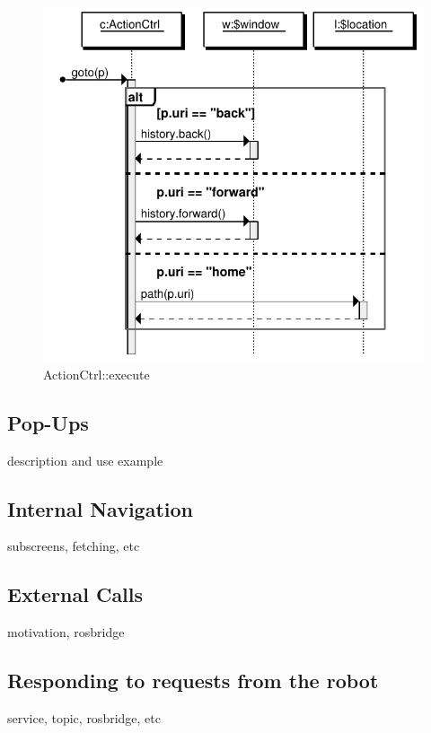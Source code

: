 \begin{figure}[htb]
    \centering
    \includegraphics{figures/design/seqdia/actionCtrl-goto.pdf}
    \caption{ActionCtrl::execute}
    \label{fig:design-seqdia-actionCtrl-goto}
\end{figure}

\subsection{Pop-Ups}
description and use example

\subsection{Internal Navigation}
subscreens, fetching, etc

\subsection{External Calls}
motivation, rosbridge

\subsection{Responding to requests from the robot}
service, topic, rosbridge, etc

